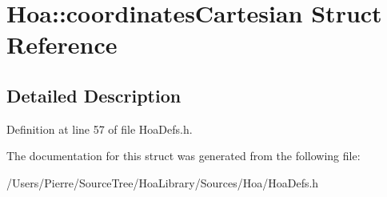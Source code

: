 \hypertarget{struct_hoa_1_1coordinates_cartesian}{\section{Hoa\-:\-:coordinates\-Cartesian Struct Reference}
\label{struct_hoa_1_1coordinates_cartesian}
}


\subsection{Detailed Description}


Definition at line 57 of file Hoa\-Defs.\-h.



The documentation for this struct was generated from the following file\-:\begin{DoxyCompactItemize}
\item 
/\-Users/\-Pierre/\-Source\-Tree/\-Hoa\-Library/\-Sources/\-Hoa/Hoa\-Defs.\-h\end{DoxyCompactItemize}
